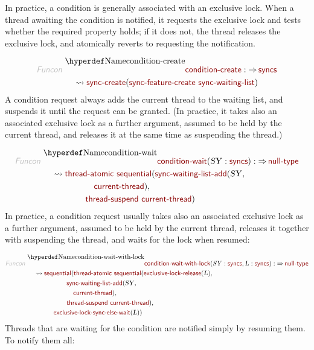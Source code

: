In practice, a condition is generally associated with an exclusive lock. When
a thread awaiting the condition is notified, it requests the exclusive lock and
tests whether the required property holds; if it does not, the thread releases
the exclusive lock, and atomically reverts to requesting the notification.

\begin{align*}
  \KEY{Funcon} ~ 
  & \NAMEDECL{condition-create} :  \TO \NAME{syncs} \\
  & \quad \leadsto \NAME{sync-create}
                     ( \NAME{sync-feature-create} ~
                         \NAME{sync-waiting-list} )
\end{align*}
A condition request always adds the current thread to the waiting list, and
suspends it until the request can be granted. (In practice, it takes also an
associated exclusive lock as a further argument, assumed to be held by the
current thread, and releases it at the same time as suspending the thread.)

\begin{align*}
  \KEY{Funcon} ~ 
  & \NAMEDECL{condition-wait}(\VAR{SY} : \NAME{syncs}) :  \TO \NAME{null-type} \\
  & \quad \leadsto \NAME{thread-atomic} ~
                     \NAME{sequential}
                       ( \NAME{sync-waiting-list-add}
                           ( \VAR{SY}, \\&\quad \quad \quad \quad \quad \quad 
                             \NAME{current-thread} ), \\&\quad \quad \quad \quad \quad 
                         \NAME{thread-suspend} ~
                           \NAME{current-thread} )
\end{align*}
In practice, a condition request usually takes also an associated exclusive lock
as a further argument, assumed to be held by the current thread, releases it
together with suspending the thread, and waits for the lock when resumed:

\begin{align*}
  \KEY{Funcon} ~ 
  & \NAMEDECL{condition-wait-with-lock}(\VAR{SY} : \NAME{syncs}, \VAR{L} : \NAME{syncs}) :  \TO \NAME{null-type} \\
  & \quad \leadsto \NAME{sequential}
                     ( \NAME{thread-atomic} ~
                         \NAME{sequential}
                           ( \NAME{exclusive-lock-release}
                               ( \VAR{L} ), \\&\quad \quad \quad \quad \quad \quad 
                             \NAME{sync-waiting-list-add}
                               ( \VAR{SY}, \\&\quad \quad \quad \quad \quad \quad \quad 
                                 \NAME{current-thread} ), \\&\quad \quad \quad \quad \quad \quad 
                             \NAME{thread-suspend} ~
                               \NAME{current-thread} ), \\&\quad \quad \quad \quad 
                       \NAME{exclusive-lock-sync-else-wait}
                         ( \VAR{L} ) )
\end{align*}
Threads that are waiting for the condition are notified simply by resuming them.
To notify them all:

